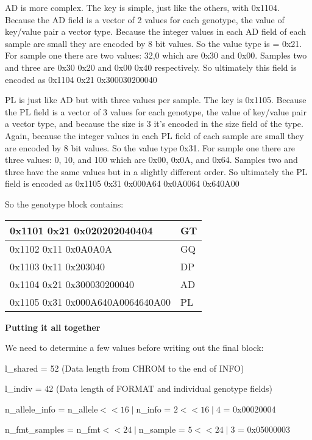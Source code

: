 \documentclass[8pt]{article}
\begin{document}
AD is more complex.  The key is simple, just like the others, with 0x1104.  Because the AD field is a vector of 2 values for each genotype, the value of key/value pair a vector type.  Because the integer values in each AD field of each sample are small they are encoded by 8 bit values.  So the value type is = 0x21.  For sample one there are two values: 32,0 which are 0x30 and 0x00.  Samples two and three are 0x30 0x20 and 0x00 0x40 respectively.  So ultimately this field is encoded as 0x1104 0x21 0x300030200040

PL is just like AD but with three values per sample.  The key is 0x1105.  Because the PL field is a vector of 3 values for each genotype, the value of key/value pair a vector type, and because the size is 3 it's encoded in the size field of the type.  Again, because the integer values in each PL field of each sample are small they are encoded by 8 bit values.  So the value type 0x31.  For sample one there are three values: 0, 10, and 100 which are 0x00, 0x0A, and 0x64.  Samples two and three have the same values but in a slightly different order.  So ultimately the PL field is encoded as 0x1105 0x31 0x000A64 0x0A0064 0x640A00

So the genotype block contains:

\vspace{0.3cm}
\begin{tabular}{|l| l|} \hline
0x1101 0x21 0x020202040404 & GT \\ \hline
0x1102 0x11 0x0A0A0A & GQ \\ \hline
0x1103 0x11 0x203040 & DP \\ \hline
0x1104 0x21 0x300030200040 & AD \\ \hline
0x1105 0x31 0x000A640A0064640A00 & PL \\ \hline
\end{tabular}
\vspace{0.3cm}

\textbf{Putting it all together}

We need to determine a few values before writing out the final block:

l\_shared = 52 (Data length from CHROM to the end of INFO)

l\_indiv = 42 (Data length of FORMAT and individual genotype fields)

n\_allele\_info = n\_allele$<<16\mid$n\_info = $2 << 16 \mid 4$ = 0x00020004

n\_fmt\_samples = n\_fmt$<<24\mid$n\_sample = $5 << 24 \mid 3$ = 0x05000003
\end{document}

